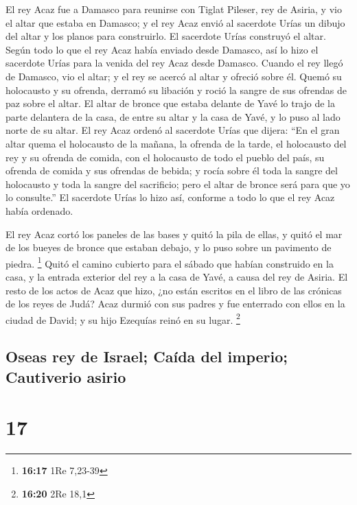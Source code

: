  El rey Acaz fue a Damasco para reunirse con Tiglat
Pileser, rey de Asiria, y vio el altar que estaba en Damasco; y el rey
Acaz envió al sacerdote Urías un dibujo del altar y los planos para
construirlo.  El sacerdote Urías construyó el altar.
Según todo lo que el rey Acaz había enviado desde Damasco, así lo hizo
el sacerdote Urías para la venida del rey Acaz desde Damasco.
 Cuando el rey llegó de Damasco, vio el altar; y el rey
se acercó al altar y ofreció sobre él.  Quemó su
holocausto y su ofrenda, derramó su libación y roció la sangre de sus
ofrendas de paz sobre el altar.  El altar de bronce que
estaba delante de Yavé lo trajo de la parte delantera de la casa, de
entre su altar y la casa de Yavé, y lo puso al lado norte de su altar.
 El rey Acaz ordenó al sacerdote Urías que dijera: ``En
el gran altar quema el holocausto de la mañana, la ofrenda de la tarde,
el holocausto del rey y su ofrenda de comida, con el holocausto de todo
el pueblo del país, su ofrenda de comida y sus ofrendas de bebida; y
rocía sobre él toda la sangre del holocausto y toda la sangre del
sacrificio; pero el altar de bronce será para que yo lo consulte.''
 El sacerdote Urías lo hizo así, conforme a todo lo que
el rey Acaz había ordenado.

 El rey Acaz cortó los paneles de las bases y quitó la
pila de ellas, y quitó el mar de los bueyes de bronce que estaban
debajo, y lo puso sobre un pavimento de piedra. \footnote{\textbf{16:17}
  1Re 7,23-39}  Quitó el camino cubierto para el sábado
que habían construido en la casa, y la entrada exterior del rey a la
casa de Yavé, a causa del rey de Asiria.  El resto de los
actos de Acaz que hizo, ¿no están escritos en el libro de las crónicas
de los reyes de Judá?  Acaz durmió con sus padres y fue
enterrado con ellos en la ciudad de David; y su hijo Ezequías reinó en
su lugar. \footnote{\textbf{16:20} 2Re 18,1}

\hypertarget{oseas-rey-de-israel-cauxedda-del-imperio-cautiverio-asirio}{%
\subsection{Oseas rey de Israel; Caída del imperio; Cautiverio
asirio}\label{oseas-rey-de-israel-cauxedda-del-imperio-cautiverio-asirio}}

\hypertarget{section-16}{%
\section{17}\label{section-16}}

